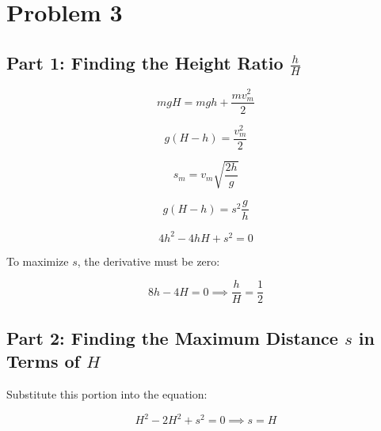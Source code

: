 \section{Problem 3}

\subsection*{Part 1: Finding the Height Ratio \( \frac{h}{H} \)}

\[mgH = mgh + \frac{mv_m^2}{2}\]

\[g(H - h) = \frac{v_m^2}{2}\]

\[s_m = v_m\sqrt{\frac{2h}{g}}\]

\[g(H - h) = s^2\frac{g}{h}\]

\[4h^2 - 4hH + s^2 = 0\]

To maximize \( s \), the derivative must be zero:

\[8h - 4H = 0 \implies \boxed{\frac{h}{H} = \frac{1}{2}}\]

\subsection*{Part 2: Finding the Maximum Distance \( s \) in Terms of \( H \)}

Substitute this portion into the equation:

\[H^2 - 2H^2 + s^2 = 0 \implies \boxed{s = H}\]
